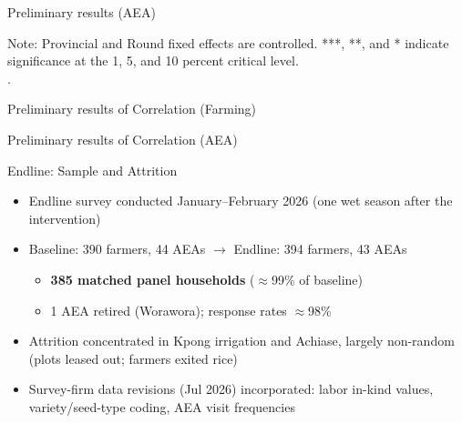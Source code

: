 \documentclass[aspectratio=169]{beamer}
\begin{document}
\begin{frame}{Preliminary results (AEA)}
	\centering
	\scalebox{0.55}{}
	\begin{tablenotes}
		\scriptsize
		\item Note: Provincial and Round fixed effects are controlled. ***, **, and * indicate significance at the 1, 5, and 10 percent critical level.  \\.  
	\end{tablenotes}
	
\end{frame}

\begin{frame}{Preliminary results of Correlation (Farming)}
	\centering
	\scalebox{0.34}{}
	
\end{frame}

\begin{frame}{Preliminary results of Correlation (AEA)}
	\centering
	\scalebox{0.5}{}
	
\end{frame}


\begin{frame}{Endline: Sample and Attrition}
\begin{itemize}
	\item Endline survey conducted January--February 2026 (one wet season after the intervention)
	\item Baseline: 390 farmers, 44 AEAs \; $\rightarrow$ \; Endline: 394 farmers, 43 AEAs
	\begin{itemize}
		\item \textbf{385 matched panel households} ($\approx$99\% of baseline)
		\item 1 AEA retired (Worawora); response rates $\approx$98\%
	\end{itemize}
	\item Attrition concentrated in Kpong irrigation and Achiase, largely non-random
	      (plots leased out; farmers exited rice)
	\item Survey-firm data revisions (Jul 2026) incorporated: labor in-kind values,
	      variety/seed-type coding, AEA visit frequencies
\end{itemize}
\end{frame}
\end{document}
